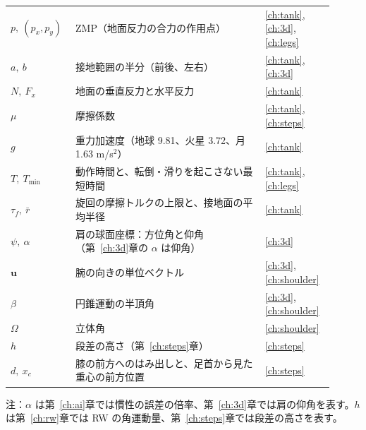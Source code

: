 \begin{longtable}{p{0.16\linewidth}p{0.55\linewidth}p{0.20\linewidth}}
$p,\ (p_x,p_y)$ & ZMP（地面反力の合力の作用点） & \ref{ch:tank}, \ref{ch:3d}, \ref{ch:legs} \\
$a,\ b$ & 接地範囲の半分（前後、左右） & \ref{ch:tank}, \ref{ch:3d} \\
$N,\ F_x$ & 地面の垂直反力と水平反力 & \ref{ch:tank} \\
$\mu$ & 摩擦係数 & \ref{ch:tank}, \ref{ch:steps} \\
$g$ & 重力加速度（地球 9.81、火星 3.72、月 1.63 m/s$^2$） & \ref{ch:tank} \\
$T,\ T_{\min}$ & 動作時間と、転倒・滑りを起こさない最短時間 & \ref{ch:tank}, \ref{ch:legs} \\
$\tau_f,\ \bar r$ & 旋回の摩擦トルクの上限と、接地面の平均半径 & \ref{ch:tank} \\
$\psi,\ \alpha$ & 肩の球面座標：方位角と仰角（第~\ref{ch:3d}章の $\alpha$ は仰角） & \ref{ch:3d} \\
$\bm u$ & 腕の向きの単位ベクトル & \ref{ch:3d}, \ref{ch:shoulder} \\
$\beta$ & 円錐運動の半頂角 & \ref{ch:3d}, \ref{ch:shoulder} \\
$\Omega$ & 立体角 & \ref{ch:shoulder} \\
$h$ & 段差の高さ（第~\ref{ch:steps}章） & \ref{ch:steps} \\
$d,\ x_c$ & 膝の前方へのはみ出しと、足首から見た重心の前方位置 & \ref{ch:steps} \\
\bottomrule
\end{longtable}

\noindent 注：$\alpha$ は第~\ref{ch:ai}章では慣性の誤差の倍率、第~\ref{ch:3d}章では肩の仰角を表す。$h$ は第~\ref{ch:rw}章では RW の角運動量、第~\ref{ch:steps}章では段差の高さを表す。
